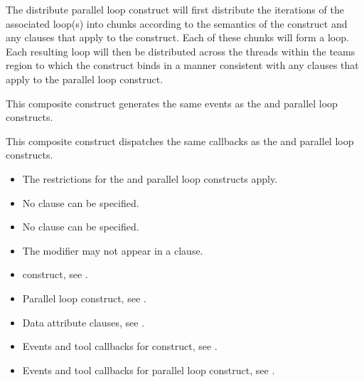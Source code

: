 \descr
The distribute parallel loop construct will first distribute the iterations of the associated loop(s) into chunks according to the semantics of the  construct and any clauses that apply to the  construct. Each of these chunks will form a loop. Each resulting loop will then be distributed across the threads within the teams region to which the  construct binds in a manner consistent with any clauses that apply to the parallel loop construct.

\events

This composite construct generates the same events as the  and parallel loop constructs.

\tools

This composite construct dispatches the same callbacks as the  and parallel loop constructs.

\vspace{-6pt}

\restrictions
\begin{itemize}
\item The restrictions for the  and parallel loop constructs apply.
\item No  clause can be specified.
\item No  clause can be specified.
\item The  modifier may not appear in a  clause.
\end{itemize}

\vspace{-6pt}

\crossreferences
\begin{itemize}
\item {} construct, see
.

\item Parallel loop construct, see
.

\item Data attribute clauses, see
.

\item Events and tool callbacks for  construct, see
.

\item Events and tool callbacks for parallel loop construct, see
.

\end{itemize}






